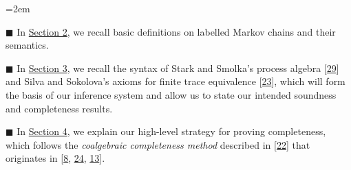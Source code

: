 \begin{list}{}{\leftmargin=2em}
\hypertarget{html:S1.I1.i1}{}
\item[]  %
\hypertarget{html:S1.I1.i1.m1}{}\({\blacksquare}\) %
\hypertarget{html:S1.I1.i1.p1}{} In \hyperlink{html:S2}{Section 2}, we recall basic definitions on labelled Markov chains and their semantics.
\par\medskip
  
\hypertarget{html:S1.I1.i2}{}
\item[]  %
\hypertarget{html:S1.I1.i2.m1}{}\({\blacksquare}\) %
\hypertarget{html:S1.I1.i2.p1}{} In \hyperlink{html:S3}{Section 3}, we recall the syntax of Stark and Smolka’s process algebra [\hyperlink{html:bib.bib29}{29}] and Silva and Sokolova’s axioms for finite trace equivalence [\hyperlink{html:bib.bib23}{23}], which will form the basis of our inference system and allow us to state our intended soundness and completeness results.
\par\medskip
  
\hypertarget{html:S1.I1.i3}{}
\item[]  %
\hypertarget{html:S1.I1.i3.m1}{}\({\blacksquare}\) %
\hypertarget{html:S1.I1.i3.p1}{} In \hyperlink{html:S4}{Section 4}, we explain our high-level strategy for proving completeness, which follows the \emph{coalgebraic completeness method} described in [\hyperlink{html:bib.bib22}{22}] that originates in [\hyperlink{html:bib.bib8}{8}, \hyperlink{html:bib.bib24}{24}, \hyperlink{html:bib.bib13}{13}].
\par\medskip
  

\end{list}
